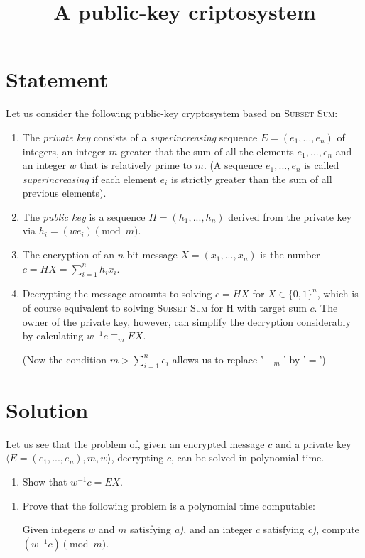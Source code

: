 \documentclass[a4paper]{article}
\title{A public-key criptosystem}
\begin{document}
\maketitle
\section*{Statement}
Let us consider the following public-key cryptosystem based on \textsc{Subset Sum}:

\begin{enumerate}[label=\alph*)]
	\item The \emph{private key} consists of a \emph{superincreasing} sequence $E = (e_1, ..., e_n)$ of integers, an integer $m$ greater that the sum of all the elements $e_1, ..., e_n$ and an integer $w$ that is relatively prime to $m$. (A sequence $e_1, ..., e_n$ is called \emph{superincreasing} if each element $e_i$ is strictly greater than the sum of all previous elements).
	\item The \emph{public key} is a sequence $H = (h_1, ..., h_n)$ derived from the private key via $h_i = (we_i) \pmod{m}$.
	\item The encryption of an $n$-bit message $X = (x_1, ..., x_n)$ is the number $c = HX = \sum_{i=1}^n h_ix_i$.
	\item Decrypting the message amounts to solving $c = HX$ for $X \in \{0, 1\}^n$, which is of course equivalent to solving \textsc{Subset Sum} for H with target sum $c$. The owner of the private key, however, can simplify the decryption considerably by calculating $w^{-1}c \equiv_m EX$.
	
	(Now the condition $m > \sum_{i=1}^n e_i$ allows us to replace '$\equiv_m$' by '$=$')
\end{enumerate}

\section*{Solution}
Let us see that the problem of, given an encrypted message $c$ and a private key $\langle E = (e_1, ..., e_n), m, w \rangle$, decrypting $c$, can be solved in polynomial time.
\begin{enumerate}[label=\roman*)]
	\item Show that $w^{-1}c = EX$.
\end{enumerate}

\begin{enumerate}[resume, label=\roman*)]
	\item Prove that the following problem is a polynomial time computable:
	
	Given integers $w$ and $m$ satisfying \emph{a)}, and an integer $c$ satisfying \emph{c)}, compute $(w^{-1}c) \pmod{m}$.
\end{enumerate}
\end{document}
